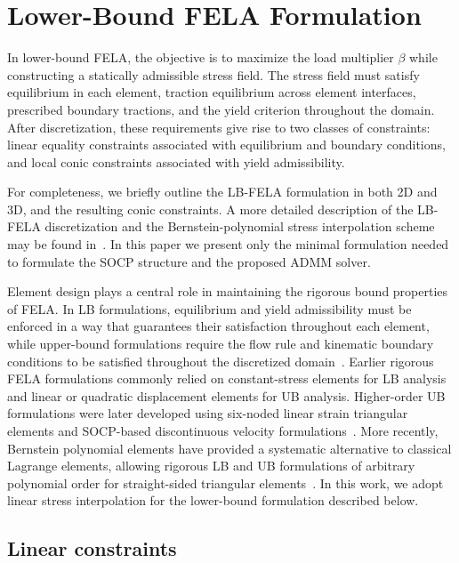 \section{Lower-Bound FELA Formulation}

In lower-bound FELA, the objective is to maximize the load multiplier $\beta$ while constructing a statically admissible stress field. The stress field must satisfy equilibrium in each element, traction equilibrium across element interfaces, prescribed boundary tractions, and the yield criterion throughout the domain. After discretization, these requirements give rise to two classes of constraints: linear equality constraints associated with equilibrium and boundary conditions, and local conic constraints associated with yield admissibility.

For completeness, we briefly outline the LB-FELA formulation in both 2D and 3D, and the resulting conic constraints. A more detailed description of the LB-FELA discretization and the Bernstein-polynomial stress interpolation scheme may be found in~\cite{2DLB,Bernstein_FELA}. In this paper we present only the minimal formulation needed to formulate the SOCP structure and the proposed ADMM solver.


Element design plays a central role in maintaining the rigorous bound properties of FELA. In LB formulations, equilibrium and yield admissibility must be enforced in a way that guarantees their satisfaction throughout each element, while upper-bound formulations require the flow rule and kinematic boundary conditions to be satisfied throughout the discretized domain~\cite{LB_Bernstein, UB_bernstein}. Earlier rigorous FELA formulations commonly relied on constant-stress elements for LB analysis and linear or quadratic displacement elements for UB analysis. Higher-order UB formulations were later developed using six-noded linear strain triangular elements and SOCP-based discontinuous velocity formulations~\cite{UB_quad, UB_discon}. More recently, Bernstein polynomial elements have provided a systematic alternative to classical Lagrange elements, allowing rigorous LB and UB formulations of arbitrary polynomial order for straight-sided triangular elements~\cite{Bernstein_FELA, LB_Bernstein, UB_bernstein}. In this work, we adopt linear stress interpolation for the lower-bound formulation described below.

\subsection{Linear constraints}

